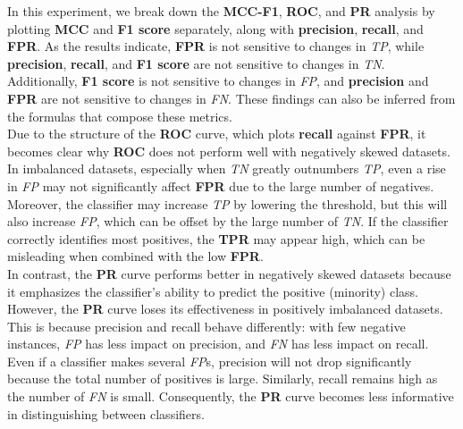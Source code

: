 \documentclass[12pt, oneside]{amsart}
\theoremstyle{definition}
\theoremstyle{remark}
\numberwithin{equation}{section}
\begin{document}
In this experiment, we break down the \textbf{MCC-F1}, \textbf{ROC}, and \textbf{PR} analysis by plotting \textbf{MCC} and \textbf{F1 score} separately, along with \textbf{precision}, \textbf{recall}, and \textbf{FPR}. As the results indicate, \textbf{FPR} is not sensitive to changes in \textit{TP}, while \textbf{precision}, \textbf{recall}, and \textbf{F1 score} are not sensitive to changes in \textit{TN}. Additionally, \textbf{F1 score} is not sensitive to changes in \textit{FP}, and \textbf{precision} and \textbf{FPR} are not sensitive to changes in \textit{FN}. These findings can also be inferred from the formulas that compose these metrics.\\

Due to the structure of the \textbf{ROC} curve, which plots \textbf{recall} against \textbf{FPR}, it becomes clear why \textbf{ROC} does not perform well with negatively skewed datasets. In imbalanced datasets, especially when \textit{TN} greatly outnumbers \textit{TP}, even a rise in \textit{FP} may not significantly affect \textbf{FPR} due to the large number of negatives. Moreover, the classifier may increase \textit{TP} by lowering the threshold, but this will also increase \textit{FP}, which can be offset by the large number of \textit{TN}. If the classifier correctly identifies most positives, the \textbf{TPR} may appear high, which can be misleading when combined with the low \textbf{FPR}. \\

In contrast, the \textbf{PR} curve performs better in negatively skewed datasets because it emphasizes the classifier's ability to predict the positive (minority) class. However, the \textbf{PR} curve loses its effectiveness in positively imbalanced datasets. This is because precision and recall behave differently: with few negative instances, \textit{FP} has less impact on precision, and \textit{FN} has less impact on recall. Even if a classifier makes several \textit{FP}s, precision will not drop significantly because the total number of positives is large. Similarly, recall remains high as the number of \textit{FN} is small. Consequently, the \textbf{PR} curve becomes less informative in distinguishing between classifiers. \\
\end{document}
